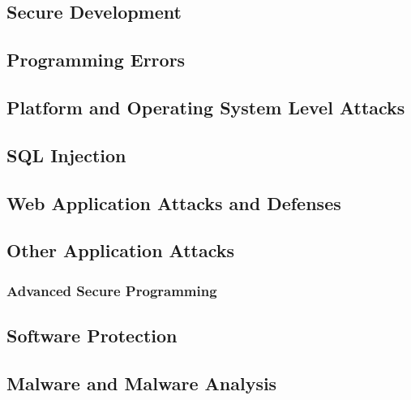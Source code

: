\documentclass[9pt]{extarticle}
\begin{document}
  \begin{multicols}{2}
  \subsection*{Secure Development}
  

  \subsection*{Programming Errors}
  

  \subsection*{Platform and Operating System Level Attacks}
  

  \subsection*{SQL Injection}
  

  \subsection*{Web Application Attacks and Defenses}
  

  \subsection*{Other Application Attacks}
  

  \subsubsection*{Advanced Secure Programming}
  

  \subsection*{Software Protection}
  

  \subsection*{Malware and Malware Analysis}
  

  \end{multicols}
\end{document}
